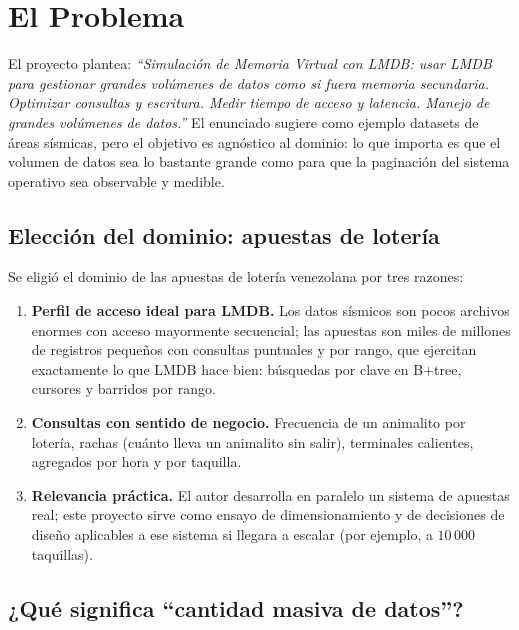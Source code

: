 \documentclass[12pt, letterpaper]{article}
\begin{document}
\section{El Problema}

El proyecto plantea: \emph{``Simulación de Memoria Virtual con LMDB: usar LMDB
para gestionar grandes volúmenes de datos como si fuera memoria secundaria.
Optimizar consultas y escritura. Medir tiempo de acceso y latencia. Manejo de
grandes volúmenes de datos.''} El enunciado sugiere como ejemplo datasets de
áreas sísmicas, pero el objetivo es agnóstico al dominio: lo que importa es
que el volumen de datos sea lo bastante grande como para que la paginación
del sistema operativo sea observable y medible.

\subsection{Elección del dominio: apuestas de lotería}

Se eligió el dominio de las apuestas de lotería venezolana por tres razones:

\begin{enumerate}
    \item \textbf{Perfil de acceso ideal para LMDB.} Los datos sísmicos son
    pocos archivos enormes con acceso mayormente secuencial; las apuestas son
    miles de millones de registros pequeños con consultas puntuales y por
    rango, que ejercitan exactamente lo que LMDB hace bien: búsquedas por
    clave en B+tree, cursores y barridos por rango.
    \item \textbf{Consultas con sentido de negocio.} Frecuencia de un
    animalito por lotería, rachas (cuánto lleva un animalito sin salir),
    terminales calientes, agregados por hora y por taquilla.
    \item \textbf{Relevancia práctica.} El autor desarrolla en paralelo un
    sistema de apuestas real; este proyecto sirve como ensayo de
    dimensionamiento y de decisiones de diseño aplicables a ese sistema si
    llegara a escalar (por ejemplo, a $10\,000$ taquillas).
\end{enumerate}

\subsection{¿Qué significa ``cantidad masiva de datos''?}
\end{document}
